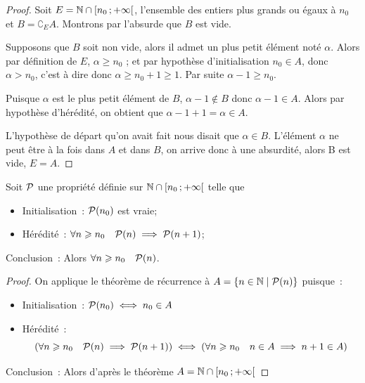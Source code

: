 \begin{proof}
  Soit \(E = \N\cap \intervallefo{n_0}{+\infty}\), l'ensemble des entiers plus 
  grands ou égaux à \(n_0\) et \(B = \complement_E A\). Montrons par l'absurde 
  que \(B\) est vide. 

  Supposons que \(B\) soit non vide, alors il admet un plus petit élément noté 
  \(\alpha\). Alors par définition de \(E\), \(\alpha\geqslant n_0\) ; et par 
  hypothèse d'initialisation \(n_0\in A\), donc \(\alpha > n_0\), c'est à dire 
  donc \(\alpha\geqslant n_0 + 1\geqslant 1\). Par suite \(\alpha - 1\geqslant 
  n_0\). 

  Puisque \(\alpha\) est le plus petit élément de \(B\), \(\alpha - 1 \notin B\) 
  donc \(\alpha - 1 \in A\). Alors par hypothèse d'hérédité, on obtient que 
  \(\alpha - 1 + 1 = \alpha\in A\). 

  L'hypothèse de départ qu'on avait fait nous disait que \(\alpha \in B\).  
  L'élément \(\alpha\) ne peut être à la fois dans \(A\) et dans \(B\), on 
  arrive donc à une absurdité, alors B est vide, \(E = A\).
\end{proof}

\begin{cor}
  \label{cor:recsimple}
  Soit \(\P\) une propriété définie sur \(\N\cap \intervallefo{n_0}{+\infty}\) 
  telle que
  \begin{itemize}
    \item Initialisation~: \(\P(n_0)\) est vraie;
    \item Hérédité~: \(\forall n\geqslant n_0 \quad \P(n) \implies \P(n + 1)\);
  \end{itemize}
  Conclusion~: Alors \(\forall n\geqslant n_0 \quad \P(n)\).
\end{cor}

\begin{proof}
  On applique le théorème de récurrence à \(A = \enstq{n\in\N}{\P(n)}\) 
  puisque~:
  \begin{itemize}
    \item Initialisation~: \(\P(n_0) \iff n_0 \in A\)
    \item Hérédité~:
      \begin{equation}
        \left(\forall n\geqslant n_0 \quad \P(n) \implies \P(n + 1)\right) \iff 
        \left( \forall n \geqslant n_0 \quad n\in A \implies n + 1\in A\right)
      \end{equation}
  \end{itemize}
  Conclusion~: Alors d'après le théorème \(A = \N\cap 
  \intervallefo{n_0}{+\infty}\)
\end{proof}


